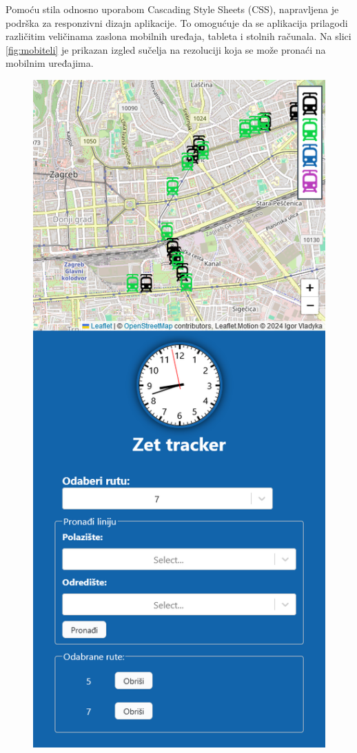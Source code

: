 \documentclass[zavrsnirad]{fer}
\begin{document}
Pomoću stila odnosno uporabom Cascading Style Sheets (CSS), napravljena je podrška za responzivni dizajn aplikacije. To omogućuje da se aplikacija prilagodi različitim veličinama zaslona mobilnih uređaja, tableta i stolnih računala. Na slici \ref{fig:mobiteli} je prikazan izgled sučelja na rezoluciji koja se može pronaći na mobilnim uređajima.
\begin{figure}[H]
	\centering
	\begin{minipage}[c]{0.45\linewidth}
		\centering
		\includegraphics[width=\textwidth]{Figures/mobitel.png}

\end{minipage}
\end{figure}
\end{document}
